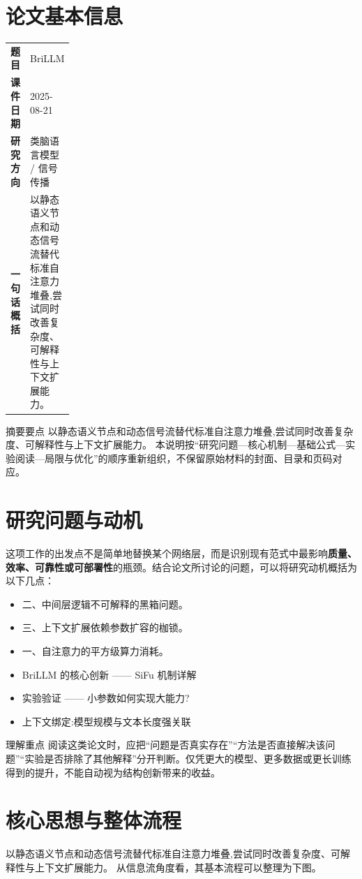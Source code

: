 \documentclass[UTF8,11pt,a4paper]{ctexart}
\newcommand{\term}[1]{\textbf{\textcolor{mainblue}{#1}}}
\begin{document}
\section{论文基本信息}
\begin{center}
\begin{tabularx}{0.94\linewidth}{>{\bfseries}p{0.18\linewidth}X}
\toprule
题目 & BriLLM\\
课件日期 & 2025-08-21\\
研究方向 & 类脑语言模型 / 信号传播\\
一句话概括 & 以静态语义节点和动态信号流替代标准自注意力堆叠,尝试同时改善复杂度、可解释性与上下文扩展能力。\\
\bottomrule
\end{tabularx}
\end{center}

\begin{infobox}{摘要要点}
以静态语义节点和动态信号流替代标准自注意力堆叠,尝试同时改善复杂度、可解释性与上下文扩展能力。 本说明按“研究问题—核心机制—基础公式—实验阅读—局限与优化”的顺序重新组织，不保留原始材料的封面、目录和页码对应。
\end{infobox}

\section{研究问题与动机}
这项工作的出发点不是简单地替换某个网络层，而是识别现有范式中最影响\term{质量、效率、可靠性或可部署性}的瓶颈。结合论文所讨论的问题，可以将研究动机概括为以下几点：
\begin{itemize}
\item 二、中间层逻辑不可解释的黑箱问题。
\item 三、上下文扩展依赖参数扩容的枷锁。
\item 一、自注意力的平方级算力消耗。
\item BriLLM 的核心创新 —— SiFu 机制详解
\item 实验验证 —— 小参数如何实现大能力?
\item 上下文绑定:模型规模与文本长度强关联
\end{itemize}

\begin{notebox}{理解重点}
阅读这类论文时，应把“问题是否真实存在”“方法是否直接解决该问题”“实验是否排除了其他解释”分开判断。仅凭更大的模型、更多数据或更长训练得到的提升，不能自动视为结构创新带来的收益。
\end{notebox}

\section{核心思想与整体流程}
以静态语义节点和动态信号流替代标准自注意力堆叠,尝试同时改善复杂度、可解释性与上下文扩展能力。 从信息流角度看，其基本流程可以整理为下图。
\end{document}

